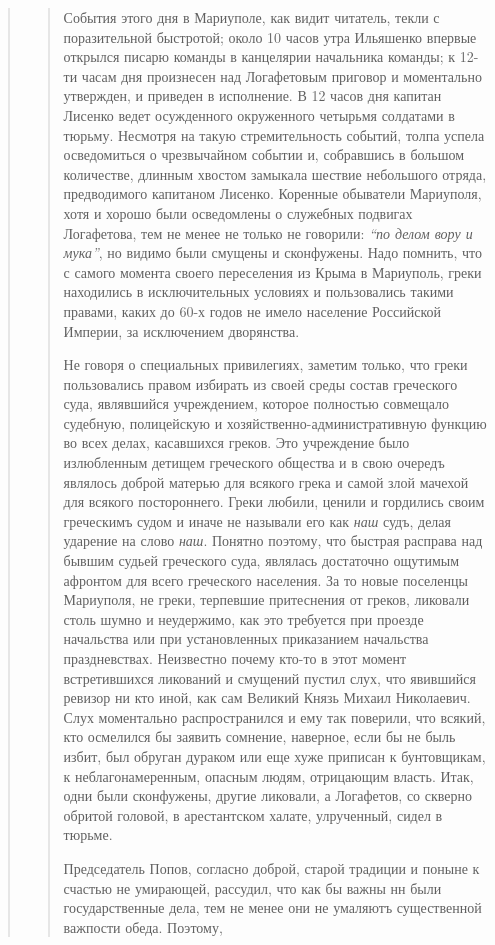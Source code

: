 \begin{quote}
\begin{quote}
События этого дня в Мариуполе, как видит читатель, текли с поразительной
быстротой; около 10 часов утра Ильяшенко впервые открылся писарю команды в
канцелярии начальника команды; к 12-ти часам дня произнесен над Логафетовым
приговор и моментально утвержден, и приведен в исполнение. В 12 часов дня
капитан Лисенко ведет осужденного окруженного четырьмя солдатами в тюрьму.
Несмотря на такую стремительность событий, толпа успела осведомиться о
чрезвычайном событии и, собравшись в большом количестве, длинным хвостом
замыкала шествие небольшого отряда, предводимого капитаном Лисенко.  Коренные
обыватели Мариуполя, хотя и хорошо были осведомлены о служебных подвигах
Логафетова, тем не менее не только не говорили: \emph{``по делом вору и
мука''}, но видимо были смущены и сконфужены. Надо помнить, что с самого
момента своего переселения из Крыма в Мариуполь, греки находились в
исключительных условиях и пользовались такими правами, каких до 60-х годов не
имело население Российской Империи, за исключением дворянства.

Не говоря о специальных привилегиях, заметим только, 
что греки пользовались правом избирать из своей
среды состав греческого суда, являвшийся учреждением,
которое полностью совмещало судебную, 
полицейскую и хозяйственно-административную функцию во всех делах, касавшихся
греков. Это учреждение было излюбленным детищем
греческого общества и в свою очередъ являлось доброй
матерью для всякого грека и самой злой мачехой для всякого
постороннего. Греки любили, ценили и гордились своим
греческимъ судом и иначе не называли его как \emph{наш}
судъ, делая ударение на слово \emph{наш}. Понятно поэтому, что
быстрая расправа над бывшим судьей греческого суда,
являлась достаточно ощутимым афронтом для всего греческого населения.  За то
новые поселенцы Мариуполя, не греки, терпевшие притеснения от греков, ликовали
столь шумно и неудержимо, как это требуется при проезде начальства или при
установленных приказанием начальства праздневствах. Неизвестно почему кто-то в
этот момент встретившихся ликований и смущений пустил слух, что явившийся
ревизор ни кто иной, как сам Великий Князь Михаил Николаевич. Слух моментально
распространился и ему так поверили, что всякий, кто осмелился бы заявить
сомнение, наверное, если бы не быль избит, был обруган дураком или еще хуже
приписан к бунтовщикам, к неблагонамеренным, опасным людям, отрицающим власть.
Итак, одни были сконфужены, другие ликовали, а Логафетов, со скверно обритой
головой, в арестантском халате, улрученный, сидел в тюрьме.

Председатель Попов, согласно доброй, старой традиции
и поныне к счастью не умирающей, рассудил, что как
бы важны нн были государственные дела, тем не менее
они не умаляютъ существенной важпости обеда. Поэтому,


\end{quote}
\end{quote}
